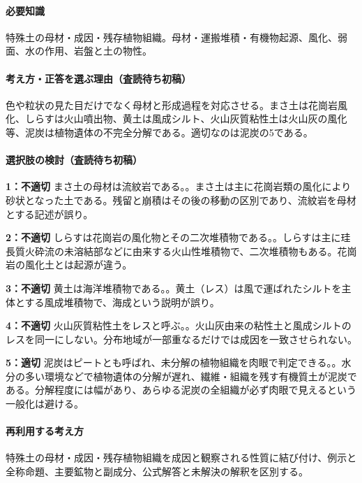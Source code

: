 \paragraph{必要知識} 特殊土の母材・成因・残存植物組織。母材・運搬堆積・有機物起源、風化、弱面、水の作用、岩盤と土の物性。

\paragraph{考え方・正答を選ぶ理由（査読待ち初稿）} 色や粒状の見た目だけでなく母材と形成過程を対応させる。まさ土は花崗岩風化、しらすは火山噴出物、黄土は風成シルト、火山灰質粘性土は火山灰の風化等、泥炭は植物遺体の不完全分解である。適切なのは泥炭の5である。

\paragraph{選択肢の検討（査読待ち初稿）}\mbox{}\par

\noindent\textbf{1：不適切} まさ土の母材は流紋岩である。。まさ土は主に花崗岩類の風化により砂状となった土である。残留と崩積はその後の移動の区別であり、流紋岩を母材とする記述が誤り。\par

\noindent\textbf{2：不適切} しらすは花崗岩の風化物とその二次堆積物である。。しらすは主に珪長質火砕流の未溶結部などに由来する火山性堆積物で、二次堆積物もある。花崗岩の風化土とは起源が違う。\par

\noindent\textbf{3：不適切} 黄土は海洋堆積物である。。黄土（レス）は風で運ばれたシルトを主体とする風成堆積物で、海成という説明が誤り。\par

\noindent\textbf{4：不適切} 火山灰質粘性土をレスと呼ぶ。。火山灰由来の粘性土と風成シルトのレスを同一にしない。分布地域が一部重なるだけでは成因を一致させられない。\par

\noindent\textbf{5：適切} 泥炭はピートとも呼ばれ、未分解の植物組織を肉眼で判定できる。。水分の多い環境などで植物遺体の分解が遅れ、繊維・組織を残す有機質土が泥炭である。分解程度には幅があり、あらゆる泥炭の全組織が必ず肉眼で見えるという一般化は避ける。\par

\paragraph{再利用する考え方} 特殊土の母材・成因・残存植物組織を成因と観察される性質に結び付け、例示と全称命題、主要鉱物と副成分、公式解答と未解決の解釈を区別する。

